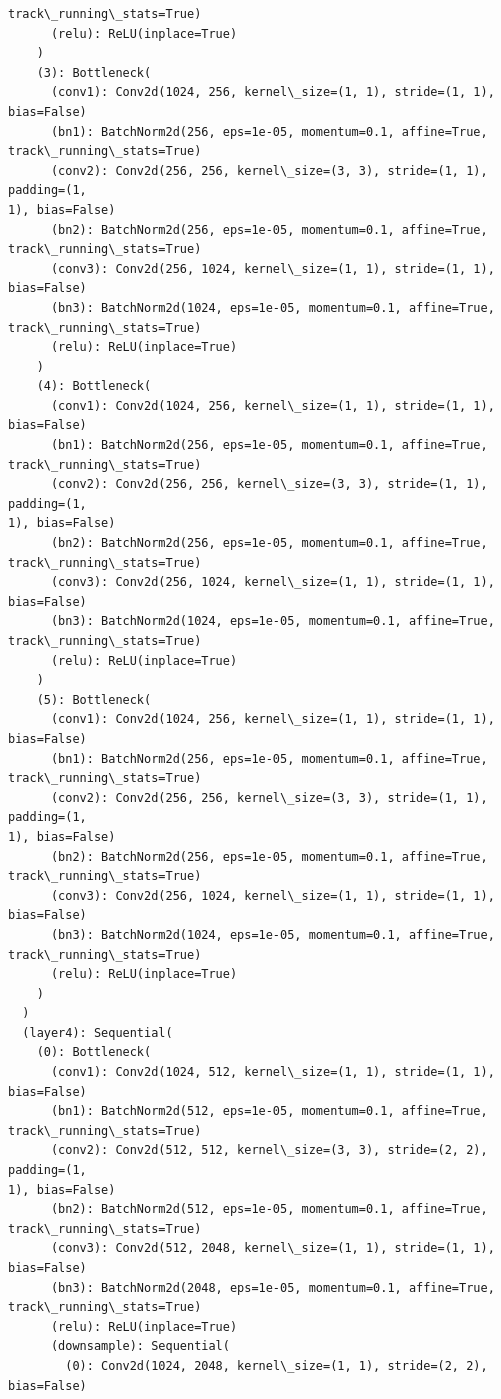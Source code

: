 \documentclass[11pt]{article}
\begin{document}
\begin{tcolorbox}[breakable, size=fbox, boxrule=.5pt, pad at break*=1mm, opacityfill=0]
\begin{Verbatim}[commandchars=\\\{\}]
track\_running\_stats=True)
      (relu): ReLU(inplace=True)
    )
    (3): Bottleneck(
      (conv1): Conv2d(1024, 256, kernel\_size=(1, 1), stride=(1, 1), bias=False)
      (bn1): BatchNorm2d(256, eps=1e-05, momentum=0.1, affine=True,
track\_running\_stats=True)
      (conv2): Conv2d(256, 256, kernel\_size=(3, 3), stride=(1, 1), padding=(1,
1), bias=False)
      (bn2): BatchNorm2d(256, eps=1e-05, momentum=0.1, affine=True,
track\_running\_stats=True)
      (conv3): Conv2d(256, 1024, kernel\_size=(1, 1), stride=(1, 1), bias=False)
      (bn3): BatchNorm2d(1024, eps=1e-05, momentum=0.1, affine=True,
track\_running\_stats=True)
      (relu): ReLU(inplace=True)
    )
    (4): Bottleneck(
      (conv1): Conv2d(1024, 256, kernel\_size=(1, 1), stride=(1, 1), bias=False)
      (bn1): BatchNorm2d(256, eps=1e-05, momentum=0.1, affine=True,
track\_running\_stats=True)
      (conv2): Conv2d(256, 256, kernel\_size=(3, 3), stride=(1, 1), padding=(1,
1), bias=False)
      (bn2): BatchNorm2d(256, eps=1e-05, momentum=0.1, affine=True,
track\_running\_stats=True)
      (conv3): Conv2d(256, 1024, kernel\_size=(1, 1), stride=(1, 1), bias=False)
      (bn3): BatchNorm2d(1024, eps=1e-05, momentum=0.1, affine=True,
track\_running\_stats=True)
      (relu): ReLU(inplace=True)
    )
    (5): Bottleneck(
      (conv1): Conv2d(1024, 256, kernel\_size=(1, 1), stride=(1, 1), bias=False)
      (bn1): BatchNorm2d(256, eps=1e-05, momentum=0.1, affine=True,
track\_running\_stats=True)
      (conv2): Conv2d(256, 256, kernel\_size=(3, 3), stride=(1, 1), padding=(1,
1), bias=False)
      (bn2): BatchNorm2d(256, eps=1e-05, momentum=0.1, affine=True,
track\_running\_stats=True)
      (conv3): Conv2d(256, 1024, kernel\_size=(1, 1), stride=(1, 1), bias=False)
      (bn3): BatchNorm2d(1024, eps=1e-05, momentum=0.1, affine=True,
track\_running\_stats=True)
      (relu): ReLU(inplace=True)
    )
  )
  (layer4): Sequential(
    (0): Bottleneck(
      (conv1): Conv2d(1024, 512, kernel\_size=(1, 1), stride=(1, 1), bias=False)
      (bn1): BatchNorm2d(512, eps=1e-05, momentum=0.1, affine=True,
track\_running\_stats=True)
      (conv2): Conv2d(512, 512, kernel\_size=(3, 3), stride=(2, 2), padding=(1,
1), bias=False)
      (bn2): BatchNorm2d(512, eps=1e-05, momentum=0.1, affine=True,
track\_running\_stats=True)
      (conv3): Conv2d(512, 2048, kernel\_size=(1, 1), stride=(1, 1), bias=False)
      (bn3): BatchNorm2d(2048, eps=1e-05, momentum=0.1, affine=True,
track\_running\_stats=True)
      (relu): ReLU(inplace=True)
      (downsample): Sequential(
        (0): Conv2d(1024, 2048, kernel\_size=(1, 1), stride=(2, 2), bias=False)

\end{Verbatim}
\end{tcolorbox}
\end{document}
